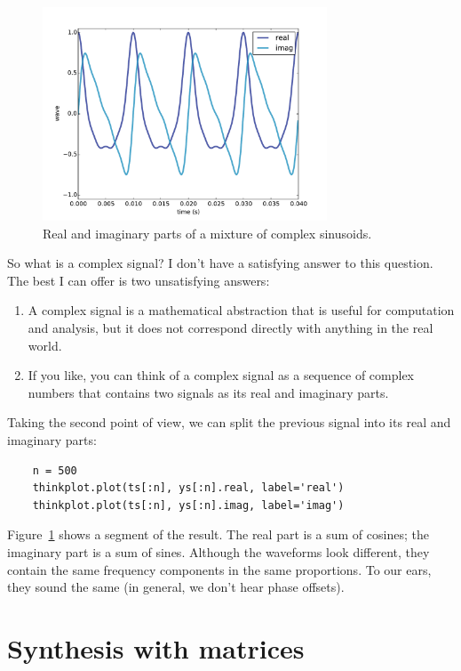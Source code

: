 \documentclass[12pt]{book}
\begin{document}
\begin{figure}
\centerline{\includegraphics[height=2.5in]{figs/dft1.pdf}}
\caption{Real and imaginary parts of a mixture of complex sinusoids.}
\label{fig.dft1}
\end{figure}

So what is a complex signal?  I don't have a satisfying answer to this
question.  The best I can offer is two unsatisfying
answers:

\begin{enumerate}

\item A complex signal is a mathematical abstraction that is useful
  for computation and analysis, but it does not correspond directly
  with anything in the real world.

\item If you like, you can think of a complex signal as a sequence of
  complex numbers that contains two signals as its real and imaginary
  parts.

\end{enumerate}

Taking the second point of view, we can split the previous
signal into its real and imaginary parts:

\begin{verbatim}
    n = 500
    thinkplot.plot(ts[:n], ys[:n].real, label='real')
    thinkplot.plot(ts[:n], ys[:n].imag, label='imag')
\end{verbatim}

Figure~\ref{fig.dft1} shows a segment of the result.  The
real part is a sum of cosines; the imaginary part is
a sum of sines.  Although the waveforms look different, they
contain the same frequency components in the same proportions.
To our ears, they sound the same (in general, we don't hear
phase offsets).


\section{Synthesis with matrices}
\label{synthmat}
\end{document}
